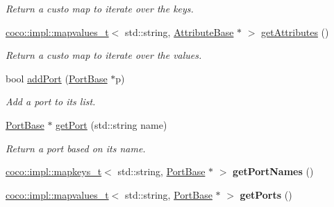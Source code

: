 \begin{DoxyCompactItemize}
\begin{DoxyCompactList}\small\item\em Return a custo map to iterate over the keys. \end{DoxyCompactList}\item 
\hypertarget{classcoco_1_1_service_a5192ee7d4cc50b4a07fae6a451587388}{}\hyperlink{structcoco_1_1impl_1_1mapvalues__t}{coco\+::impl\+::mapvalues\+\_\+t}$<$ std\+::string, \hyperlink{classcoco_1_1_attribute_base}{Attribute\+Base} $\ast$ $>$ \hyperlink{classcoco_1_1_service_a5192ee7d4cc50b4a07fae6a451587388}{get\+Attributes} ()\label{classcoco_1_1_service_a5192ee7d4cc50b4a07fae6a451587388}

\begin{DoxyCompactList}\small\item\em Return a custo map to iterate over the values. \end{DoxyCompactList}\item 
\hypertarget{classcoco_1_1_service_a57fce01d8c5fc7b77058238a072d4fce}{}bool \hyperlink{classcoco_1_1_service_a57fce01d8c5fc7b77058238a072d4fce}{add\+Port} (\hyperlink{classcoco_1_1_port_base}{Port\+Base} $\ast$p)\label{classcoco_1_1_service_a57fce01d8c5fc7b77058238a072d4fce}

\begin{DoxyCompactList}\small\item\em Add a port to its list. \end{DoxyCompactList}\item 
\hypertarget{classcoco_1_1_service_a12e05c075e9fd899e795a1e929333c71}{}\hyperlink{classcoco_1_1_port_base}{Port\+Base} $\ast$ \hyperlink{classcoco_1_1_service_a12e05c075e9fd899e795a1e929333c71}{get\+Port} (std\+::string name)\label{classcoco_1_1_service_a12e05c075e9fd899e795a1e929333c71}

\begin{DoxyCompactList}\small\item\em Return a port based on its name. \end{DoxyCompactList}\item 
\hypertarget{classcoco_1_1_service_a1d0f592af2a57dcdf91ddcd0371b6dd3}{}\hyperlink{structcoco_1_1impl_1_1mapkeys__t}{coco\+::impl\+::mapkeys\+\_\+t}$<$ std\+::string, \hyperlink{classcoco_1_1_port_base}{Port\+Base} $\ast$ $>$ {\bfseries get\+Port\+Names} ()\label{classcoco_1_1_service_a1d0f592af2a57dcdf91ddcd0371b6dd3}

\item 
\hypertarget{classcoco_1_1_service_aac5db21221f154a61d4bf7f76d303fb8}{}\hyperlink{structcoco_1_1impl_1_1mapvalues__t}{coco\+::impl\+::mapvalues\+\_\+t}$<$ std\+::string, \hyperlink{classcoco_1_1_port_base}{Port\+Base} $\ast$ $>$ {\bfseries get\+Ports} ()\label{classcoco_1_1_service_aac5db21221f154a61d4bf7f76d303fb8}


\end{DoxyCompactItemize}

